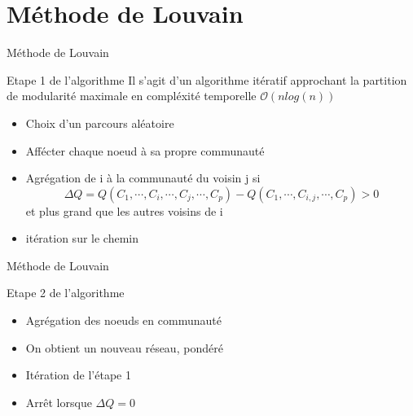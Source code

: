 \documentclass[11pt]{beamer}
\begin{document}
	\section{Méthode de Louvain}

	\begin{frame}{Méthode de Louvain}
		\scriptsize
		\begin{block}{Etape 1 de l'algorithme}
			Il s'agit d'un algorithme itératif approchant la partition de modularité maximale en compléxité temporelle $\mathcal{O}(nlog(n))$
			\begin{itemize}
				\item Choix d'un parcours aléatoire\\
				\item Affécter chaque noeud à sa propre communauté\\
				\item Agrégation de i à la communauté du voisin j si 
					\[
					\Delta Q = Q(C_1, \cdots, C_i, \cdots, C_j, \cdots, C_p) - Q(C_1, \cdots, C_{i,j}, \cdots, C_p)>0
					\]
					et plus grand que les autres voisins de i 
				\item itération sur le chemin 
			\end{itemize} 
		\end{block}
	\end{frame}
	\begin{frame}{Méthode de Louvain}
		\scriptsize
		\begin{block}{Etape 2 de l'algorithme}
			\begin{itemize}
				\item Agrégation des noeuds en communauté\\
				\item On obtient un nouveau réseau, pondéré\\
				\item Itération de l'étape 1 
				\item Arrêt lorsque $\Delta Q=0$
			\end{itemize} 
		\end{block}
	\end{frame}
\end{document}
